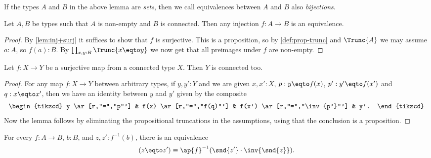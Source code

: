 If the types $A$ and $B$ in the above lemma are \emph{sets},
then we call equivalences between $A$ and $B$ also \emph{bijections}.

\begin{corollary}\label{cor:inj+connected}
Let $A,B$ be types such that $A$ is non-empty and $B$ is connected.
Then any injection $f: A\to B$ is an equivalence.
\end{corollary}
\begin{proof}
By \cref{lem:inj+surj} it suffices to show that $f$ is surjective.
This is a proposition, so by \cref{def:prop-trunc} and $\Trunc{A}$
we may assume $a:A$, so $f(a):B$. By $\prod_{x,y:B} \Trunc{x \eqto y}$
we now get that all preimages under $f$ are non-empty.
\end{proof}

\begin{lemma}\label{lem:whenisbasespaceconnected}
Let $f:X\to Y$ be a surjective map from a connected type $X$. Then $Y$ is connected too.
\end{lemma}
\begin{proof}
For any map $f:X\to Y$ between arbitrary types, if $y,y':Y$ and we are given
$x,x':X$, $p:y \eqto f(x)$, $p':y' \eqto f(x')$ and $q:x \eqto x'$,
then we have an identity between $y$ and $y'$ given by the composite
\[
  \begin{tikzcd}
    y \ar[r,"=","p"'] & f(x) \ar[r,"=","f(q)"'] & f(x') \ar[r,"=","\inv{p'}"'] & y'.
  \end{tikzcd}
\]
Now the lemma follows by eliminating the propositional truncations in the assumptions,
using that the conclusion is a proposition.
\end{proof}

\begin{construction}\label{con:fib-vs-path}
  For every $f:A\to B$, $b:B$, and $z,z' : f^{-1}(b)$,
  there is an equivalence 
  \begin{equation}\label{eq:fib_vs-path}
    (z \eqto z') \equiv \ap{f}^{-1}(\snd{z'} \cdot \inv{\snd{z}}).
  \end{equation}
\end{construction}

